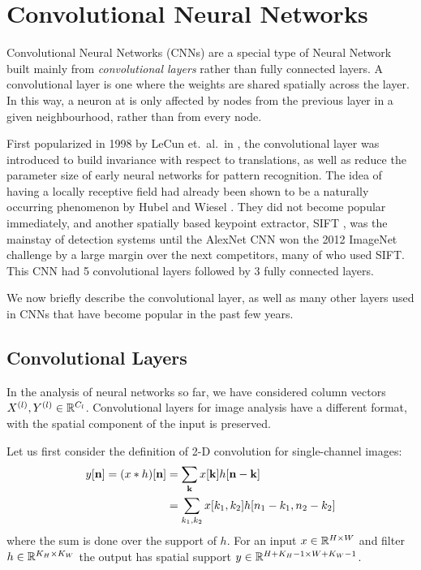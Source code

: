 \section{Convolutional Neural Networks}\label{sec:ch2:cnns}
Convolutional Neural Networks (CNNs) are a special type of Neural Network built mainly from
\emph{convolutional layers} rather than fully connected layers. A convolutional
layer is one where the weights are shared spatially across the layer.
In this way, a neuron at is only affected by
nodes from the previous layer in a given neighbourhood, rather than from every node.

First popularized in 1998 by LeCun et.\ al.\ in \cite{lecun_gradient-based_1998},
the convolutional layer was introduced to build invariance with respect to
translations, as well as reduce the parameter size of early neural networks for
pattern recognition. The idea of having a locally receptive field had already
been shown to be a naturally occurring phenomenon by Hubel and Wiesel
\cite{hubel_receptive_1962}. They did not become popular immediately, and
another spatially based keypoint extractor, SIFT \cite{lowe_distinctive_2004},
was the mainstay of detection systems until the AlexNet CNN
\cite{krizhevsky_imagenet_2012} won the 2012 ImageNet challenge
\cite{russakovsky_imagenet_2014} by a large margin over the next competitors, many of
who used SIFT. This CNN had 5 convolutional layers followed by 3 fully
connected layers.

We now briefly describe the convolutional layer, as well as many other layers
used in CNNs that have become popular in the past few years.

\subsection{Convolutional Layers}\label{sec:ch2:conv_layers}
In the analysis of neural networks so far, we have considered column vectors
$X^{(l)},Y^{(l)} \in \reals[C_{l}]$. Convolutional layers for image analysis
have a different format, with the spatial component of the input is
preserved.

Let us first consider the definition of 2-D convolution for single-channel
images:
\begin{align}
  y[\nn] = (x\conv h)[\nn] &= \sum_{\mathbf{k}} x[\mathbf{k}]h[\nn-\mathbf{k}] \label{eq:ch2:conv1}\\
                           &= \sum_{k_1, k_2} x[k_1,k_2]h[n_1-k_1, n_2-k_2]
\end{align}
where the sum is done over the support of $h$. For an input $x\in \reals[H\x W]$
and filter $h\in \reals[K_H\x K_W]$ the output has spatial support $y\in
\reals[H+K_H-1 \x W+K_W-1]$.

